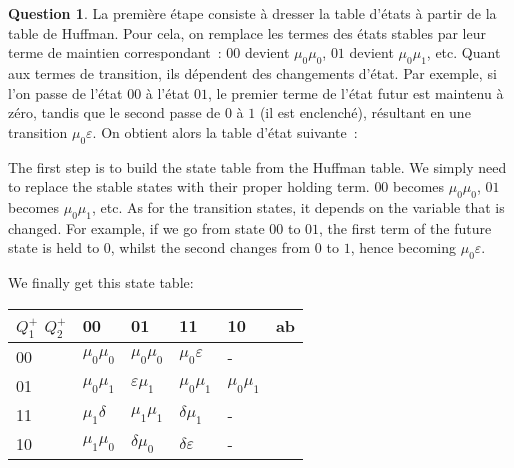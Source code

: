 \documentclass[11pt,a4paper,dvipsnames]{article}
\theoremstyle{definition}%
\newtheorem{Q}{Question}[] %
\newcommand{\fr}[1]{
 	\ifthenelse {\boolean{fr}} {#1} {}
 }
\newcommand{\en}[1]{
 	\ifthenelse {\boolean{en}} {#1} {}
 }
\begin{document}
\begin{Q}
{		\fr{La première étape consiste à dresser la table d'états à partir de la table de Huffman.
		Pour cela, on remplace les termes des états stables par leur terme de maintien correspondant~: $00$ devient $\mu_0\mu_0$, $01$ devient $\mu_0\mu_1$, etc.
		Quant aux termes de transition, ils dépendent des changements d'état. Par exemple, si l'on passe de l'état $00$ à l'état $01$, le premier terme de l'état futur est maintenu à zéro, tandis que le second passe de $0$ à $1$ (il est enclenché), résultant en une transition $\mu_0\varepsilon$.
		On obtient alors la table d'état suivante~:}

		\en{The first step is to build the state table from the Huffman table.
		We simply need to replace the stable states with their proper holding term.
		$00$ becomes $\mu_0\mu_0$, $01$ becomes $\mu_0\mu_1$, etc.
		As for the transition states, it depends on the variable that is changed.
		For example, if we go from state $00$ to $01$, the first term of the future state is held to $0$, whilst the second changes from $0$ to $1$, hence becoming $\mu_0\varepsilon$.

		We finally get this state table:}
		\begin{center}
			\begin{tabular}{|l|l|l|l|l|l} \hline
			$Q^+_1$ $Q^+_2$ & 00         & 01         & 11         & 10         & \multicolumn{1}{l|}{ab} \\ \hline
			00           & $\mu_0\mu_0$ & $\mu_0\mu_0$ & $\mu_0\varepsilon$ & - & \\ \cline{1-5}
			01           & $\mu_0\mu_1$ & $\varepsilon\mu_1$ & $\mu_0\mu_1$ & $\mu_0\mu_1$ & \\ \cline{1-5}
			11           & $\mu_1\delta$ & $\mu_1\mu_1$ & $\delta\mu_1$ & - & \\ \cline{1-5}
			10           & $\mu_1\mu_0$ & $\delta\mu_0$ & $\delta\varepsilon$ & - & \\ \cline{1-5}
			\end{tabular}
		\end{center}

}
\end{Q}
\end{document}
